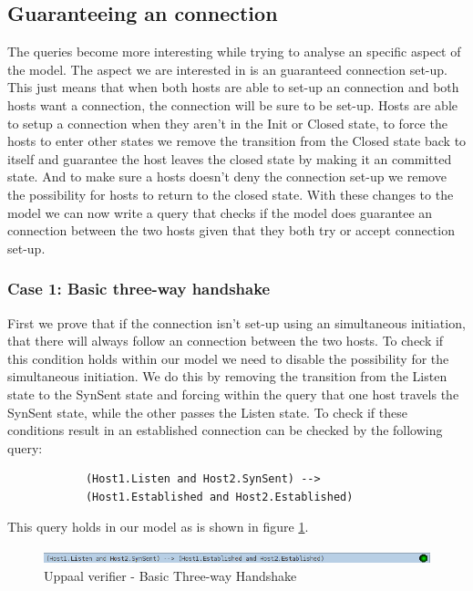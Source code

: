 \documentclass[twocolumn]{article}
\begin{document}
	\subsection{Guaranteeing an connection} %
	\label{sub:guaranteeing_an_connection}
		The queries become more interesting while trying to analyse an specific aspect of the model. The aspect we are interested in is an guaranteed connection set-up. This just means that when both hosts are able to set-up an connection and both hosts want a connection, the connection will be sure to be set-up. Hosts are able to setup a connection when they aren't in the Init or Closed state, to force the hosts to enter other states we remove the transition from the Closed state back to itself and guarantee the host leaves the closed state by making it an committed state. And to make sure a hosts doesn't deny the connection set-up we remove the possibility for hosts to return to the closed state. With these changes to the model we can now write a query that checks if the model does guarantee an connection between the two hosts given that they both try or accept connection set-up.

		\subsubsection{Case 1: Basic three-way handshake}
		First we prove that if the connection isn't set-up using an simultaneous initiation, that there will always follow an connection between the two hosts. To check if this condition holds within our model we need to disable the possibility for the simultaneous initiation. We do this by removing the transition from the Listen state to the SynSent state and forcing within the query that one host travels the SynSent state, while the other passes the Listen state. To check if these conditions result in an established connection can be checked by the following query:
		\begin{verbatim}
			(Host1.Listen and Host2.SynSent) -->
			(Host1.Established and Host2.Established)
		\end{verbatim}
		This query holds in our model as is shown in figure \ref{fig:verifier2}.
		\begin{figure}[h!]
			\begin{center}
				\includegraphics[width=\linewidth]{verifier-listen.png}
			\end{center}
			\caption{Uppaal verifier - Basic Three-way Handshake}
			\label{fig:verifier2}
		\end{figure}
		
\end{document}
